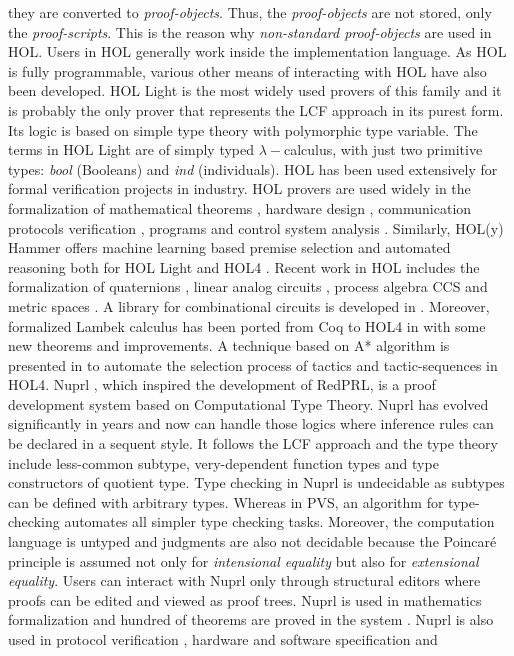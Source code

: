 they are converted to {\em proof-objects}. Thus, the {\em proof-objects} are not stored, only the {\em proof-scripts}. 
This is the reason why {\em non-standard proof-objects} are used in HOL.
Users in HOL generally work inside the implementation language. As HOL is fully programmable, various other means of interacting 
with HOL have also been developed. HOL Light is the most widely used provers of this family and it is probably the only prover that represents the 
LCF approach in its purest form. Its logic is based on simple type theory with polymorphic type variable. The terms in HOL Light are of simply typed 
$\lambda-$calculus, 
with just two primitive types: {\em bool} (Booleans) and {\em ind} (individuals). HOL has been used extensively for formal verification projects in industry.
HOL provers are used widely in the formalization of mathematical theorems , hardware design ,
communication protocols verification , programs  
and control system analysis . 
Similarly, HOL(y) Hammer offers machine learning based premise selection and automated reasoning both for HOL Light and HOL4 .
Recent work in HOL includes the formalization of quaternions , linear analog circuits ,
process algebra CCS  and metric spaces . A library for combinational circuits is developed in .
Moreover, formalized Lambek calculus has been ported from Coq to HOL4 in  with some new theorems and improvements. 
A technique based on A* algorithm is presented in  to automate the selection process of 
tactics and tactic-sequences in HOL4.
Nuprl , which inspired the development of RedPRL, is a proof development system based on Computational
Type Theory. Nuprl has evolved significantly in years and now can handle those logics 
where inference rules can be declared in a sequent style. It follows the LCF approach and the type theory include less-common subtype, 
very-dependent function types and type constructors of quotient type. Type checking in Nuprl is undecidable as subtypes can be defined with arbitrary types. 
Whereas in PVS, an algorithm for type-checking automates all simpler type checking tasks. Moreover, the computation language is untyped and judgments are also not 
decidable because the Poincar{\'e} principle is assumed not only for {\em intensional equality} but also for {\em extensional equality}. Users can interact
with Nuprl only through structural editors where proofs can be edited and viewed as proof trees.
Nuprl is used in mathematics formalization and hundred of theorems are proved in the system . 
Nuprl is also used in protocol verification , hardware and software specification and 
